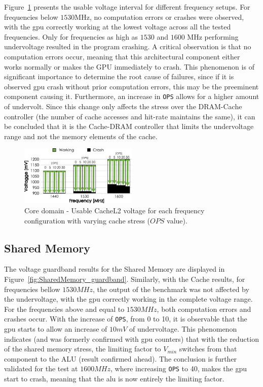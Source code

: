 Figure~\ref{fig:CacheL2_guardband} presents the usable voltage interval for different frequency setups. For frequencies below $1530$MHz, no computation errors or crashes were observed, with the \acrshort{gpu} correctly working at the lowest voltage across all the tested frequencies. Only for frequencies as high as $1530$ and $1600$ MHz performing undervoltage resulted in the program crashing. A critical observation is that no computation errors occur, meaning that this architectural component either works normally or makes the GPU immediately to crash. This phenomenon is of significant importance to determine the root cause of failures, since if it is observed \acrshort{gpu} crash without prior computation errors, this may be the preeminent component causing it.
Furthermore, an increase in \texttt{OPS} allows for a higher amount of undervolt. Since this change only affects the stress over the DRAM-Cache controller (the number of cache accesses and hit-rate maintains the same), it can be concluded that it is the Cache-DRAM controller that limits the undervoltage range and not the memory elements of the cache.


\begin{figure}[htb]
  \centering
  \includegraphics[width=0.5\textwidth]{Figures/GPU_characterization/CacheL2_guardband.pdf}
  \caption{Core domain - Usable CacheL2 voltage for each frequency configuration with varying cache stress ($OPS$ value).}
  \label{fig:CacheL2_guardband}
\end{figure}


\subsection{Shared Memory}

\label{sec:cache_guardband}

The voltage guardband results for the Shared Memory are displayed in Figure~\ref{fig:SharedMemory_guardband}. Similarly, with the Cache results, for frequencies bellow $1530MHz$, the output of the benchmark was not affected by the undervoltage, with the \acrshort{gpu} correctly working in the complete voltage range. For the frequencies above and equal to $1530MHz$, both computation errors and crashes occur. With the increase of \texttt{OPS}, from 0 to 10, it is observable that the \acrshort{gpu} starts to allow an increase of $10mV$ of undervoltage. This phenomenon indicates (and was formerly confirmed with \acrshort{gpu} counters) that with the reduction of the shared memory stress, the limiting factor to $V_{min}$ switches from that component to the ALU (result confirmed ahead). The conclusion is further validated for the test at $1600MHz$, where increasing  \texttt{OPS} to 40, makes the \acrshort{gpu} start to crash, meaning that the \acrshort{alu} is now entirely the limiting factor.

